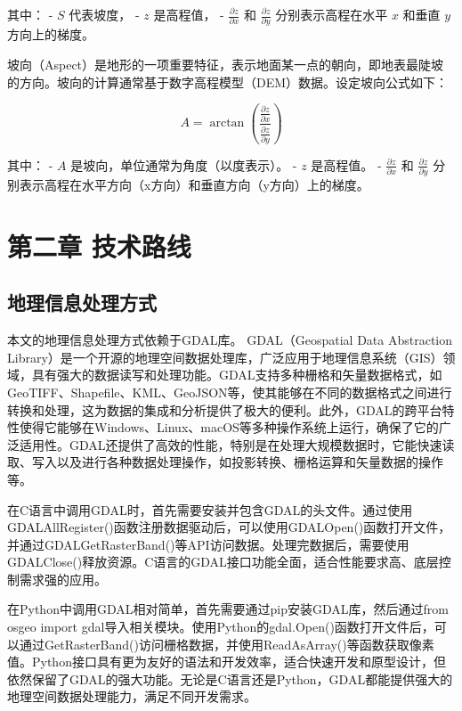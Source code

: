\documentclass{article}
\begin{document}
		其中：
		- \( S \) 代表坡度，
		- \( z \) 是高程值，
		- \( \frac{\partial z}{\partial x} \) 和 \( \frac{\partial z}{\partial y} \) 分别表示高程在水平 \( x \) 和垂直 \( y \) 方向上的梯度。

		
		坡向（Aspect）是地形的一项重要特征，表示地面某一点的朝向，即地表最陡坡的方向。坡向的计算通常基于数字高程模型（DEM）数据。设定坡向公式如下：
		
		\[
		A = \arctan \left( \frac{ \frac{\partial z}{\partial x} }{ \frac{\partial z}{\partial y} } \right)
		\]
		
		其中：
		- \( A \) 是坡向，单位通常为角度（以度表示）。
		- \( z \) 是高程值。
		- \( \frac{\partial z}{\partial x} \) 和 \( \frac{\partial z}{\partial y} \) 分别表示高程在水平方向（x方向）和垂直方向（y方向）上的梯度。
		
		
	\section{第二章 技术路线}
	
	
	\subsection{地理信息处理方式}

	本文的地理信息处理方式依赖于GDAL库。
	GDAL（Geospatial Data Abstraction Library）是一个开源的地理空间数据处理库，广泛应用于地理信息系统（GIS）领域，具有强大的数据读写和处理功能。GDAL支持多种栅格和矢量数据格式，如GeoTIFF、Shapefile、KML、GeoJSON等，使其能够在不同的数据格式之间进行转换和处理，这为数据的集成和分析提供了极大的便利。此外，GDAL的跨平台特性使得它能够在Windows、Linux、macOS等多种操作系统上运行，确保了它的广泛适用性。GDAL还提供了高效的性能，特别是在处理大规模数据时，它能快速读取、写入以及进行各种数据处理操作，如投影转换、栅格运算和矢量数据的操作等。
	
	在C语言中调用GDAL时，首先需要安装并包含GDAL的头文件。通过使用GDALAllRegister()函数注册数据驱动后，可以使用GDALOpen()函数打开文件，并通过GDALGetRasterBand()等API访问数据。处理完数据后，需要使用GDALClose()释放资源。C语言的GDAL接口功能全面，适合性能要求高、底层控制需求强的应用。
	
	在Python中调用GDAL相对简单，首先需要通过pip安装GDAL库，然后通过from osgeo import gdal导入相关模块。使用Python的gdal.Open()函数打开文件后，可以通过GetRasterBand()访问栅格数据，并使用ReadAsArray()等函数获取像素值。Python接口具有更为友好的语法和开发效率，适合快速开发和原型设计，但依然保留了GDAL的强大功能。无论是C语言还是Python，GDAL都能提供强大的地理空间数据处理能力，满足不同开发需求。
\end{document}
